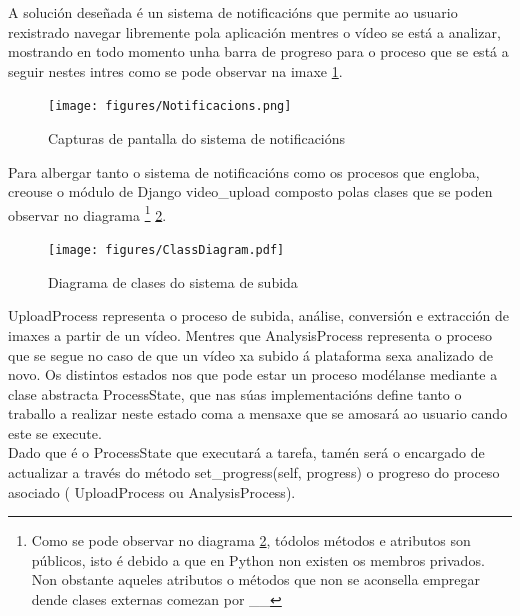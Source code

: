         A solución deseñada é un sistema de notificacións que permite ao usuario rexistrado navegar libremente
        pola aplicación mentres o vídeo se está a analizar, mostrando en todo momento unha barra de progreso
        para o proceso que se está a seguir nestes intres como se pode observar na imaxe 
        \ref{fig:Notificacions}.
        
        \begin{figure}[htp]
        \begin{center}
            \texttt{[image: figures/Notificacions.png]}
            \caption{Capturas de pantalla do sistema de notificacións}
        \label{fig:Notificacions}
        \end{center}
        \end{figure}
        
        Para albergar tanto o sistema de notificacións como os procesos que engloba, creouse o módulo de 
        Django video\_upload composto polas clases que se poden observar no diagrama 
        \footnote{Como se pode observar no diagrama \ref{fig:ClassDiagram},
        tódolos métodos e atributos son públicos, isto é debido a que en Python non existen os 
        membros privados. Non obstante aqueles atributos o métodos que non se aconsella empregar
        dende clases externas comezan por \_\_} \ref{fig:ClassDiagram}.

        \begin{figure}[htp]
        \begin{center}
            \texttt{[image: figures/ClassDiagram.pdf]}
            \caption{Diagrama de clases do sistema de subida}
        \label{fig:ClassDiagram}
        \end{center}
        \end{figure}
        
        UploadProcess representa o proceso de subida, análise, conversión e extracción de imaxes
        a partir de un vídeo. Mentres que AnalysisProcess representa o proceso que se segue no 
        caso de que un vídeo xa subido á plataforma sexa analizado de novo. Os distintos estados
        nos que pode estar un proceso modélanse mediante a clase abstracta ProcessState, que nas
        súas implementacións define tanto o traballo a realizar neste estado coma a mensaxe que 
        se amosará ao usuario cando este se execute.\\
        
        Dado que é o ProcessState que executará a tarefa, tamén será o encargado de actualizar
        a través do método set\_progress(self, progress) o progreso do proceso asociado (
        UploadProcess ou AnalysisProcess).\\
        
